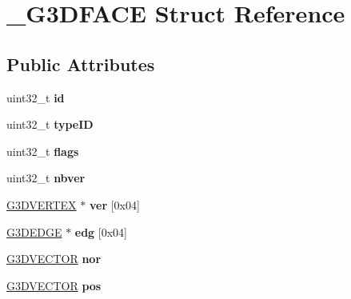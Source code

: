 \hypertarget{struct__G3DFACE}{}\section{\+\_\+\+G3\+D\+F\+A\+CE Struct Reference}
\label{struct__G3DFACE}
\subsection*{Public Attributes}
\begin{DoxyCompactItemize}
\item 
\mbox{\label{struct__G3DFACE_ae10b83424eb0939005590f31b78910eb}} 
uint32\+\_\+t {\bfseries id}
\item 
\mbox{\label{struct__G3DFACE_a68c696f5d24a5ce59c7ee37688211836}} 
uint32\+\_\+t {\bfseries type\+ID}
\item 
\mbox{\label{struct__G3DFACE_a35a4fbdceaadc3c7cf024ecec302b371}} 
uint32\+\_\+t {\bfseries flags}
\item 
\mbox{\label{struct__G3DFACE_a64a01bc4049fed54748678b4c36077ae}} 
uint32\+\_\+t {\bfseries nbver}
\item 
\mbox{\label{struct__G3DFACE_acd95898a76a2fc25951abbbf78b8d047}} 
\hyperlink{struct__G3DVERTEX}{G3\+D\+V\+E\+R\+T\+EX} $\ast$ {\bfseries ver} \mbox{[}0x04\mbox{]}
\item 
\mbox{\label{struct__G3DFACE_a774ff08e897703a0b924581e42e4cae6}} 
\hyperlink{struct__G3DEDGE}{G3\+D\+E\+D\+GE} $\ast$ {\bfseries edg} \mbox{[}0x04\mbox{]}
\item 
\mbox{\label{struct__G3DFACE_aa6613ede300190edbbd61860698ff6de}} 
\hyperlink{struct__G3DVECTOR}{G3\+D\+V\+E\+C\+T\+OR} {\bfseries nor}
\item 
\mbox{\label{struct__G3DFACE_a4bb74ffc64abc1d7814d99bb69f72363}} 
\hyperlink{struct__G3DVECTOR}{G3\+D\+V\+E\+C\+T\+OR} {\bfseries pos}
\item 
\mbox{\label{struct__G3DFACE_a6dc9f58397b139cafd5652b49b9ee132}} 

\end{DoxyCompactItemize}
